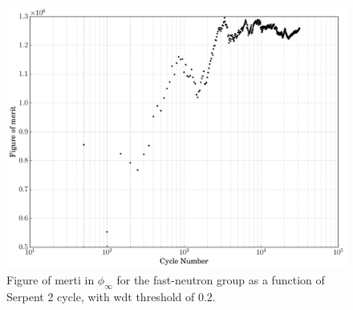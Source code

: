 \begin{figure}[hbtp]
  \centering
  \includegraphics[scale=0.4]{images/fom_convergence_example}
  \caption[Figure of merit in $\phi_{\infty}$ for the fast-neutron group as a
    function of Serpent 2 cycle.]{Figure of merti in $\phi_{\infty}$ for the fast-neutron group as a
    function of Serpent 2 cycle, with \gls{wdt} threshold of 0.2.}
  \label{fig:fom_convergence}
\end{figure}









